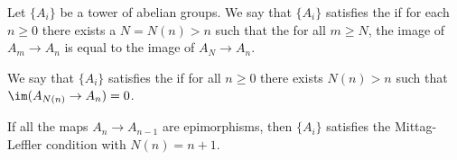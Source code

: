 \documentclass[main.tex]{subfiles}
\begin{document}
\begin{definition}
  \label{def:mittag_leffler_condition}
  Let \(\{A_{i}\}\) be a tower of abelian groups. We say that \(\{A_{i}\}\) satisfies the  if for each \(n \geq 0\) there exists a \(N = N(n) > n\) such that the for all \(m \geq N\), the image of \(A_{m} \to A_{n}\) is equal to the image of \(A_{N} \to A_{n}\).

  We say that \(\{A_{i}\}\) satisfies the  if for all \(n \geq 0\) there exists \(N(n) > n\) such that \(\im(A_{N(n)} \to A_{n}) = 0\).
\end{definition}

\begin{example}
  If all the maps \(A_{n} \to A_{n-1}\) are epimorphisms, then \(\{A_{i}\}\) satisfies the Mittag-Leffler condition with \(N(n) = n+1\).
\end{example}
\end{document}
